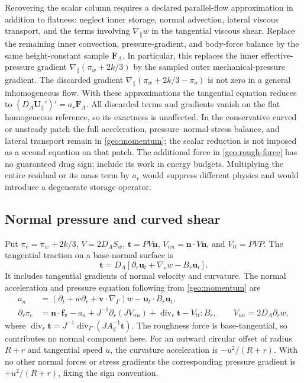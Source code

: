 \documentclass[11pt,a4paper]{article}
\numberwithin{equation}{section}
\begin{document}
Recovering the scalar column requires a declared parallel-flow
approximation in addition to flatness: neglect inner storage,
normal advection, lateral viscous transport, and the terms involving
$\nabla_\parallel w$ in the tangential viscous shear. Replace the
remaining inner convection, pressure-gradient, and body-force balance
by the same height-constant sample $\boldsymbol F_A$. In particular,
this replaces the inner effective-pressure gradient
$\nabla_\parallel(\pi_w+2k/3)$ by the sampled outer mechanical-pressure
gradient. The discarded gradient
$\nabla_\parallel(\pi_w+2k/3-\pi_o)$ is not zero in a general
inhomogeneous flow. With these approximations the tangential equation
reduces to $(D_A\boldsymbol U_\parallel')'=a_r\boldsymbol F_A$.
All discarded terms and gradients vanish on the flat homogeneous
reference, so its exactness is unaffected.
In the conservative curved or unsteady patch the full acceleration,
pressure--normal-stress balance, and lateral transport remain in
\cref{geo:momentum}; the scalar reduction is not imposed as a second
equation on that patch.  The additional force in
\cref{geo:rough-force} has no guaranteed drag sign; include its work
in energy budgets.  Multiplying the entire residual or its mass
term by $a_r$ would suppress different physics and would introduce
a degenerate storage operator.

\subsection{Normal pressure and curved shear}

Put $\pi_e=\pi_w+2k/3$, $V=2D_AS_w$,
$\boldsymbol t=PV\boldsymbol n$, $V_{nn}=\boldsymbol n\cdot V\boldsymbol n$,
and $V_{tt}=PVP$.  The tangential traction on a base-normal surface is
\begin{equation}
 \boxed{\boldsymbol t=D_A\left[
 \partial_r\boldsymbol u_t+\nabla_r w-B_r\boldsymbol u_t\right].}
 \label{geo:curved-shear}
\end{equation}
It includes tangential gradients of normal velocity and curvature.
The normal acceleration and pressure equation following from
\cref{geo:momentum} are
\begin{align}
 a_n&=(\partial_t+w\partial_r+
          \boldsymbol v\cdot\nabla_\Gamma)w
       -\boldsymbol u_t\cdot B_r\boldsymbol u_t,
 \label{geo:normal-acceleration}\\
 \partial_r\pi_e
 &=\boldsymbol n\cdot\boldsymbol f_\pi-a_n
   +J^{-1}\partial_r(JV_{nn})
   +\operatorname{div}_r\boldsymbol t-V_{tt}:B_r,
 \qquad V_{nn}=2D_A\partial_rw,
 \label{geo:normal-pressure}
\end{align}
where $\operatorname{div}_r\boldsymbol t
=J^{-1}\operatorname{div}_\Gamma(JA_g^{-1}\boldsymbol t)$.
The roughness force is base-tangential, so contributes no normal
component here.  For an outward circular offset of radius $R+r$
and tangential speed $u$, the curvature acceleration is
$-u^2/(R+r)$.  With no other normal forces or stress gradients the
corresponding pressure gradient is $+u^2/(R+r)$, fixing the sign
convention.
\end{document}
